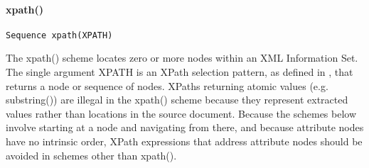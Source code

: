 \paragraph[{xpath()}]{xpath()}\label{SATSXP}\par
\texttt{Sequence xpath(XPATH)}\par
The  {\name xpath()} scheme locates zero or more nodes within an XML Information Set. The single argument XPATH is an XPath selection pattern, as defined in , that returns a node or sequence of nodes. XPaths returning atomic values (e.g.  {\name substring()}) are illegal in the  {\name xpath()} scheme because they represent extracted values rather than locations in the source document. Because the schemes below involve starting at a node and navigating from there, and because attribute nodes have no intrinsic order, XPath expressions that address attribute nodes should be avoided in schemes other than  {\name xpath()}.\par
